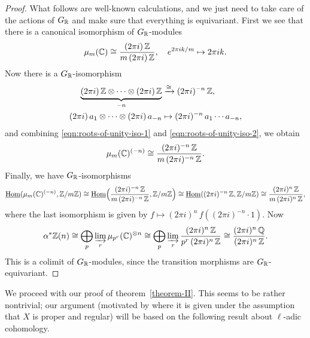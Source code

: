 \documentclass{article}
\numberwithin{equation}{section}
\begin{document}
\begin{proposition}
\begin{proof}
    What follows are well-known calculations, and we just need to take care of
    the actions of $G_{\mathbb{R}}$ and make sure that everything is equivariant. First
    we see that there is a canonical isomorphism of $G_{\mathbb{R}}$-modules
    \begin{equation}
      \label{eqn:roots-of-unity-iso-1}
      \mu_m (\mathbb{C}) \cong \frac{(2\pi i) \, \mathbb{Z}}{m\,(2\pi i)\,\mathbb{Z}}, \quad
      e^{2\pi i k/m} \mapsto 2\pi i k.
    \end{equation}
    Now there is a $G_{\mathbb{R}}$-isomorphism
    \begin{align}
      \label{eqn:roots-of-unity-iso-2}
      \underbrace{(2\pi i)\,\mathbb{Z}\otimes\cdots\otimes (2\pi i)\,\mathbb{Z}}_{-n} & \xrightarrow{\cong} (2\pi i)^{-n}\,\mathbb{Z},\\
      \notag (2\pi i)\,a_1\otimes\cdots\otimes (2\pi i)\,a_{-n} & \mapsto (2\pi i)^{-n}\,a_1\cdots a_{-n},
    \end{align}
    and combining \eqref{eqn:roots-of-unity-iso-1}
    and \eqref{eqn:roots-of-unity-iso-2}, we obtain
    $$\mu_m (\mathbb{C})^{(-n)} \cong \frac{(2\pi i)^{-n} \, \mathbb{Z}}{m\,(2\pi i)^{-n}\,\mathbb{Z}}.$$
    Finally, we have $G_{\mathbb{R}}$-isomorphisms
    \[ \underline{\operatorname{Hom}} (\mu_m (\mathbb{C})^{(-n)}, \mathbb{Z}/m\mathbb{Z}) \cong
    \underline{\operatorname{Hom}} \Bigl(\frac{(2\pi i)^{-n} \, \mathbb{Z}}{m\,(2\pi i)^{-n}\,\mathbb{Z}}, \mathbb{Z}/m\mathbb{Z}\Bigr) \cong
    \underline{\operatorname{Hom}} ((2\pi i)^{-n}\,\mathbb{Z}, \mathbb{Z}/m\mathbb{Z}) \cong
    \frac{(2\pi i)^n\,\mathbb{Z}}{m\,(2\pi i)^n\,\mathbb{Z}}, \]
    where the last isomorphism is given by
    $f \mapsto (2\pi i)^n \, f ((2\pi i)^{-n}\cdot 1)$.
    Now
    \[ \alpha^* \mathbb{Z} (n) \cong
    \bigoplus_p \varinjlim_r \mu_{p^r} (\mathbb{C})^{\otimes n} \cong
    \bigoplus_p \varinjlim_r \frac{(2\pi i)^n\,\mathbb{Z}}{p^r\,(2\pi i)^n\,\mathbb{Z}} \cong
    \frac{(2\pi i)^n\,\mathbb{Q}}{(2\pi i)^n\,\mathbb{Z}}. \]
    This is a colimit of $G_{\mathbb{R}}$-modules, since the transition morphisms are
    $G_{\mathbb{R}}$-equivariant.
  \end{proof}
\end{proposition}

We proceed with our proof of theorem~\ref{theorem-II}. This seems to be rather
nontrivial; our argument (motivated by \cite{Flach-Morin-2018} where it is given
under the assumption that $X$ is proper and regular) will be based on the
following result about $\ell$-adic cohomology.
\end{document}
